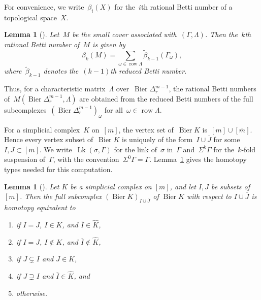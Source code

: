 \documentclass[11pt]{amsart}
\theoremstyle{plain}
\newtheorem{lemma}[theorem]{Lemma}
\numberwithin{equation}{section}
\theoremstyle{definition}
\DeclareMathOperator{\Lk}{Lk}
\DeclareMathOperator{\row}{row}
\DeclareMathOperator{\Bier}{Bier}
\begin{document}
For convenience, we write~$\beta_i(X)$ for the~$i$th rational Betti number of a topological space~$X$.
\begin{lemma}[\cite{Choi-Park2017Cohomology}]\label{lem:choi-park2017cohomology}
    Let~$M$ be the small cover associated with~$(\Gamma,\Lambda)$.
    Then the~$k$th rational Betti number of~$M$ is given by
    $$
        \beta_k(M)=\sum_{\omega\in \row \Lambda}\widetilde{\beta}_{k-1}(\Gamma_\omega),
    $$
    where~$\widetilde{\beta}_{k-1}$ denotes the~$(k-1)$th reduced Betti number.
\end{lemma}

Thus, for a characteristic matrix~$\Lambda$ over~$\Bier\Delta_r^{m-1}$, the rational Betti numbers of~$M(\Bier\Delta^{m-1}_{r},\Lambda)$ are obtained from the reduced Betti numbers of the full subcomplexes~$(\Bier\Delta^{m-1}_{r})_{\omega}$ for all~$\omega\in\row\Lambda$.

For a simplicial complex~$K$ on~$[m]$, the vertex set of~$\Bier K$ is~$[m]\cup[\overline{m}]$. 
Hence every vertex subset of~$\Bier K$ is uniquely of the form~$I\cup\overline{J}$ for some~$I,J\subset[m]$.
We write~$\Lk(\sigma,\Gamma)$ for the link of~$\sigma$ in~$\Gamma$ and~$\Sigma^k\Gamma$ for the~$k$-fold suspension of~$\Gamma$, with the convention~$\Sigma^0\Gamma=\Gamma$.
Lemma~\ref{thm:full_subcomplex_Bier} gives the homotopy types needed for this computation.

\begin{lemma}[\cite{Choi-Yoon-Yu2026}]\label{thm:full_subcomplex_Bier}
    Let $K$ be a simplicial complex on $[m]$, and let $I,J$ be subsets of $[m]$.
    Then the full subcomplex $(\Bier K)_{I\cup\overline{J}}$ of $\Bier K$ with respect to $I\cup\overline{J}$ is homotopy equivalent to
    \begin{enumerate}
        \item\label{thm:full_subcomplex_1}  if $I=J$, $I\in K$, and $\overline{I}\in\widehat{K}$,
        \item\label{thm:full_subcomplex_2}  if $I=J$, $I\notin K$, and $\overline{I}\notin\widehat{K}$,
        \item\label{thm:full_subcomplex_3} \makebox[4cm][l]{$\Sigma^{|J|}\Lk(J,K\vert_I)$, } if $J\subsetneq I$ and $J\in K$,
        \item\label{thm:full_subcomplex_4} \makebox[4cm][l]{$\Sigma^{|I|}\Lk(\overline{I},\widehat{K}\vert_{\overline{J}})$,} if $J\supsetneq I$ and $\overline{I}\in\widehat{K}$, and
        \item\label{thm:full_subcomplex_5}  otherwise.
    \end{enumerate}
\end{lemma}
\end{document}

